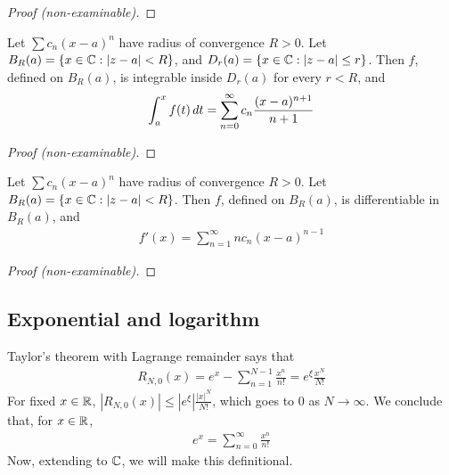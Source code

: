 \documentclass{../../template/note}
\begin{document}
    \begin{proof}[Proof (non-examinable)]
    \end{proof}

    \begin{proposition}
        Let \(\sum c_n(x-a)^n\) have radius of convergence \(R > 0\). Let \(B_R(a) = \{x \in \mathbb C: |z-a| < R\}\), and \(D_r(a) = \{x \in \mathbb C: |z-a| \leq r\}\). Then \(f\), defined on \(B_R(a)\), is integrable inside \(D_r(a)\) for every \(r < R\), and
        \begin{align*}
            \int_a^x f(t) \,d{t} = \sum_{n=0}^\infty c_n \frac{(x-a)^{n+1}}{n+1}
        \end{align*}
    \end{proposition}
    
    \begin{proof}[Proof (non-examinable)]
    \end{proof}

    \begin{proposition}
        Let \(\sum c_n(x-a)^n\) have radius of convergence \(R > 0\). Let \(B_R(a) = \{x \in \mathbb C: |z-a| < R\}\). Then \(f\), defined on \(B_R(a)\), is differentiable in \(B_R(a)\), and 
        \begin{align*}
            f'(x) = \sum_{n=1}^\infty nc_n(x-a)^{n-1}
        \end{align*}
    \end{proposition}
    
    \begin{proof}[Proof (non-examinable)]
    \end{proof}
    
    
    


    \subsection{Exponential and logarithm}
    
    Taylor's theorem with Lagrange remainder says that
    \begin{align*}
        R_{N,0}(x) = e^x - \sum_{n=1}^{N-1} \frac{x^n}{n!} = e^\xi \frac{x^N}{N!}
    \end{align*}
    For fixed \(x \in \mathbb R\), \(|R_{N,0}(x)| \leq |e^\xi| \frac{|x|^N}{N!}\), which goes to 0 as \(N \to \infty\). We conclude that, for \(x \in \mathbb R\),
    \begin{align*}
        e^x = \sum_{n=0}^\infty \frac{x^n}{n!}
    \end{align*}
    Now, extending to \(\mathbb C\), we will make this definitional.
\end{document}
